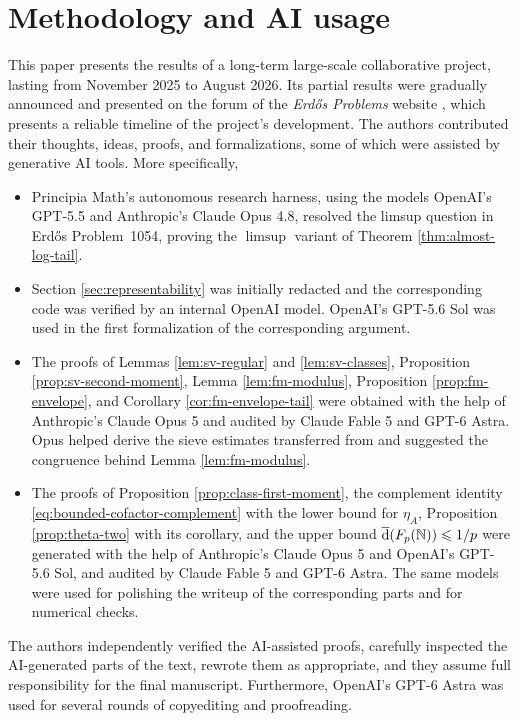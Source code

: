 \documentclass[11pt,letterpaper,reqno]{amsart}
\numberwithin{equation}{section}
\theoremstyle{remark}
\newcommand{\N}{\mathbb{N}}
\newcommand{\upperdens}{\overline{\textup{d}}}
\renewcommand{\leq}{\leqslant}
\begin{document}
\section*{Methodology and AI usage}
This paper presents the results of a long-term large-scale collaborative project, lasting from November 2025 to August 2026. Its partial results were gradually announced and presented on the forum of the \emph{Erd\H{o}s Problems} website \cite{Bloom1054}, which presents a reliable timeline of the project's development. The authors contributed their thoughts, ideas, proofs, and formalizations, some of which were assisted by generative AI tools. More specifically,
\begin{itemize}
\item Principia Math's autonomous research harness, using the models OpenAI's GPT-5.5 and Anthropic's Claude Opus 4.8, resolved the limsup question in Erd\H{o}s Problem~1054, proving the $\limsup$ variant of Theorem \ref{thm:almost-log-tail}.

\item Section \ref{sec:representability} was initially redacted and the corresponding code was verified by an internal OpenAI model.
OpenAI's GPT-5.6 Sol was used in the first formalization of the corresponding argument.

\item The proofs of Lemmas \ref{lem:sv-regular} and \ref{lem:sv-classes}, Proposition \ref{prop:sv-second-moment}, Lemma \ref{lem:fm-modulus}, Proposition \ref{prop:fm-envelope}, and Corollary \ref{cor:fm-envelope-tail} were obtained with the help of Anthropic's Claude Opus 5 and audited by Claude Fable 5 and GPT-6 Astra. Opus helped derive the sieve estimates transferred from \cite{LucaPomerance} and suggested the congruence behind Lemma \ref{lem:fm-modulus}.

\item The proofs of Proposition \ref{prop:class-first-moment}, the complement identity \eqref{eq:bounded-cofactor-complement} with the lower bound for $\eta_A$, Proposition \ref{prop:theta-two} with its corollary, and the upper bound $\upperdens(F_p(\N))\leq1/p$ were generated with the help of Anthropic's Claude Opus 5 and OpenAI's GPT-5.6 Sol, and audited by Claude Fable 5 and GPT-6 Astra. The same models were used for polishing the writeup of the corresponding parts and for numerical checks.

\end{itemize}

The authors independently verified the AI-assisted proofs, carefully inspected the AI-generated parts of the text, rewrote them as appropriate, and they assume full responsibility for the final manuscript. Furthermore, OpenAI's GPT-6 Astra was used for several rounds of copyediting and proofreading.
\end{document}
